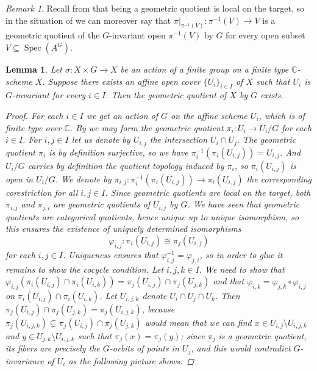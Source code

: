 \documentclass[12pt,a4paper]{amsart}
\theoremstyle{plain}
\newtheorem{lm}[thm]{Lemma}
\theoremstyle{definition}
\theoremstyle{remark}
\newtheorem{rem}[thm]{Remark}
\begin{document}
\begin{rem}\label{rem:loct2}
  Recall from  that being a geometric quotient is local on the target, so in the situation of  we can moreover say that $\pi|_{\pi^{-1}(V)} \colon \pi^{-1}(V) \to V$ is a geometric quotient of the $G$-invariant open $\pi^{-1}(V)$ by $G$ for every open subset $V \subseteq \operatorname{Spec}(A^{G})$.
\end{rem}

\begin{lm}\label{lm:affinecover}
  Let $\sigma \colon X \times G \to X$ be an action of a finite group on a finite type $\mathbb{C}$-scheme $X$.
  Suppose there exists an affine open cover $\{ U_{i} \}_{i \in I}$ of $X$ such that $U_{i}$ is $G$-invariant for every $i \in I$.
  Then the geometric quotient of $X$ by $G$ exists.

  \begin{proof}
    For each $i \in I$ we get an action of $G$ on the affine scheme $U_{i}$, which is of finite type over $\mathbb{C}$.
    By  we may form the geometric quotient $\pi_{i} \colon U_{i} \to U_{i}/G$ for each $i \in I$.
    For $i, j \in I$ let us denote by $U_{i,j}$ the intersection $U_{i} \cap U_{j}$.
    The geometric quotient $\pi_{i}$ is by definition surjective, so we have $\pi_{i}^{-1}(\pi_{i}(U_{i,j})) = U_{i,j}$.
    And $U_{i}/G$ carries by definition the quotient topology induced by $\pi_{i}$, so $\pi_{i}(U_{i,j})$ is open in $U_{i}/G$.
    We denote by $\pi_{i,j} \colon \pi_{i}^{-1}(\pi_{i}(U_{i,j})) \to \pi_{i}(U_{i,j})$ the corresponding corestriction for all $i, j \in I$.
    Since geometric quotients are local on the target, both $\pi_{i,j}$ and $\pi_{j,i}$ are geometric quotients of $U_{i,j}$ by $G$.
    We have seen that geometric quotients are categorical quotients, hence unique up to unique isomorphism, so this ensures the existence of uniquely determined isomorphisms
    \[ \varphi_{i,j} \colon \pi_{i}(U_{i,j}) \cong \pi_{j}(U_{i,j}) \]
    for each $i, j \in I$.
    Uniqueness ensures that $\varphi_{i,j}^{-1} = \varphi_{j,i}$, so in order to glue it remains to show the cocycle condition.
    Let $i, j, k \in I$.
    We need to show that $\varphi_{i,j}(\pi_{i}(U_{i,j})\cap \pi_{i}(U_{i,k})) = \pi_{j}(U_{i,j}) \cap \pi_{j}(U_{j,k})$ and that $\varphi_{i,k} = \varphi_{j,k} \circ \varphi_{i,j}$ on $\pi_{i}(U_{i,j}) \cap \pi_{i}(U_{i,k})$.
    Let $U_{i,j,k}$ denote $U_{i} \cap U_{j} \cap U_{k}$.
    Then $\pi_{j}(U_{i,j}) \cap \pi_{j}(U_{j,k}) = \pi_{j}(U_{i,j,k})$, because $\pi_{j}(U_{i,j,k}) \subsetneq \pi_{j}(U_{i,j}) \cap \pi_{j}(U_{j,k})$ would mean that we can find $x \in U_{i,j} \setminus U_{i,j,k}$ and $y \in U_{j,k} \setminus U_{i,j,k}$ such that $\pi_{j}(x) = \pi_{j}(y)$; since $\pi_{j}$ is a geometric quotient, its fibers are precisely the $G$-orbits of points in $U_{j}$, and this would contradict $G$-invariance of $U_{i}$ as the following picture shows:


\end{proof}
\end{lm}
\end{document}
